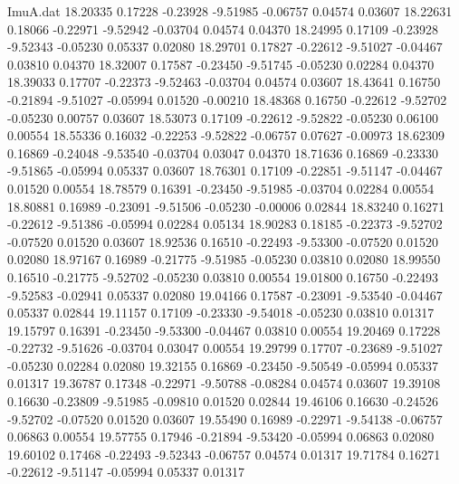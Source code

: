 \begin{filecontents}{ImuA.dat}
  18.20335    0.17228   -0.23928   -9.51985   -0.06757    0.04574    0.03607
  18.22631    0.18066   -0.22971   -9.52942   -0.03704    0.04574    0.04370
  18.24995    0.17109   -0.23928   -9.52343   -0.05230    0.05337    0.02080
  18.29701    0.17827   -0.22612   -9.51027   -0.04467    0.03810    0.04370
  18.32007    0.17587   -0.23450   -9.51745   -0.05230    0.02284    0.04370
  18.39033    0.17707   -0.22373   -9.52463   -0.03704    0.04574    0.03607
  18.43641    0.16750   -0.21894   -9.51027   -0.05994    0.01520   -0.00210
  18.48368    0.16750   -0.22612   -9.52702   -0.05230    0.00757    0.03607
  18.53073    0.17109   -0.22612   -9.52822   -0.05230    0.06100    0.00554
  18.55336    0.16032   -0.22253   -9.52822   -0.06757    0.07627   -0.00973
  18.62309    0.16869   -0.24048   -9.53540   -0.03704    0.03047    0.04370
  18.71636    0.16869   -0.23330   -9.51865   -0.05994    0.05337    0.03607
  18.76301    0.17109   -0.22851   -9.51147   -0.04467    0.01520    0.00554
  18.78579    0.16391   -0.23450   -9.51985   -0.03704    0.02284    0.00554
  18.80881    0.16989   -0.23091   -9.51506   -0.05230   -0.00006    0.02844
  18.83240    0.16271   -0.22612   -9.51386   -0.05994    0.02284    0.05134
  18.90283    0.18185   -0.22373   -9.52702   -0.07520    0.01520    0.03607
  18.92536    0.16510   -0.22493   -9.53300   -0.07520    0.01520    0.02080
  18.97167    0.16989   -0.21775   -9.51985   -0.05230    0.03810    0.02080
  18.99550    0.16510   -0.21775   -9.52702   -0.05230    0.03810    0.00554
  19.01800    0.16750   -0.22493   -9.52583   -0.02941    0.05337    0.02080
  19.04166    0.17587   -0.23091   -9.53540   -0.04467    0.05337    0.02844
  19.11157    0.17109   -0.23330   -9.54018   -0.05230    0.03810    0.01317
  19.15797    0.16391   -0.23450   -9.53300   -0.04467    0.03810    0.00554
  19.20469    0.17228   -0.22732   -9.51626   -0.03704    0.03047    0.00554
  19.29799    0.17707   -0.23689   -9.51027   -0.05230    0.02284    0.02080
  19.32155    0.16869   -0.23450   -9.50549   -0.05994    0.05337    0.01317
  19.36787    0.17348   -0.22971   -9.50788   -0.08284    0.04574    0.03607
  19.39108    0.16630   -0.23809   -9.51985   -0.09810    0.01520    0.02844
  19.46106    0.16630   -0.24526   -9.52702   -0.07520    0.01520    0.03607
  19.55490    0.16989   -0.22971   -9.54138   -0.06757    0.06863    0.00554
  19.57755    0.17946   -0.21894   -9.53420   -0.05994    0.06863    0.02080
  19.60102    0.17468   -0.22493   -9.52343   -0.06757    0.04574    0.01317
  19.71784    0.16271   -0.22612   -9.51147   -0.05994    0.05337    0.01317

\end{filecontents}
